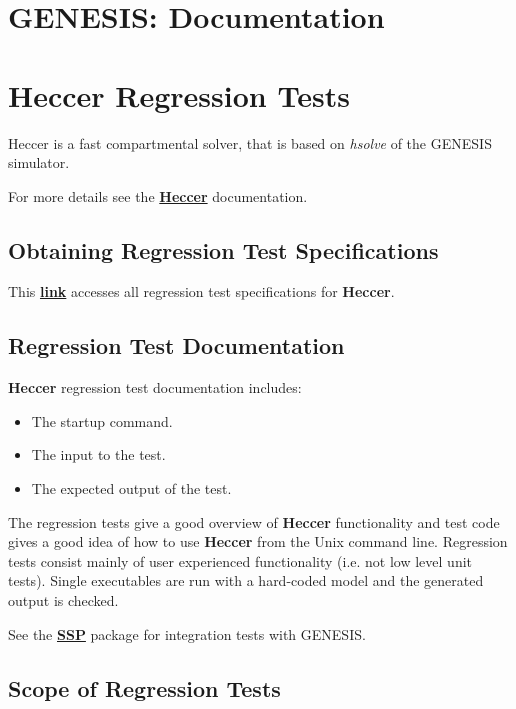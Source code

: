 \documentclass[12pt]{article}
\begin{document}
\section*{GENESIS: Documentation}

\section*{Heccer Regression Tests}

Heccer is a fast compartmental solver, that is based on {\it hsolve} of the GENESIS simulator.

For more details see the \href{../heccer/heccer.tex}{\bf Heccer} documentation.

\subsection*{Obtaining Regression Test Specifications}

This \href{http://www.neurospaces.org/neurospaces_project/heccer/tests/html/index.html}{\bf link} accesses all regression test specifications for {\bf Heccer}.

\subsection*{Regression Test Documentation}

{\bf Heccer} regression test documentation includes:
\begin{itemize}
\item The startup command.
\item The input to the test.
\item The expected output of the test.
\end{itemize}
The regression tests give a good overview of {\bf Heccer} functionality and test code gives a good idea of how to use {\bf Heccer} from the Unix command line. Regression tests consist mainly of user experienced functionality (i.e. not low level unit tests). Single executables are run with a hard-coded model and the generated output is checked.

See the \href{../ssp/ssp.tex}{\bf SSP} package for integration tests with GENESIS.

\subsection*{Scope of Regression Tests}
\end{document}

